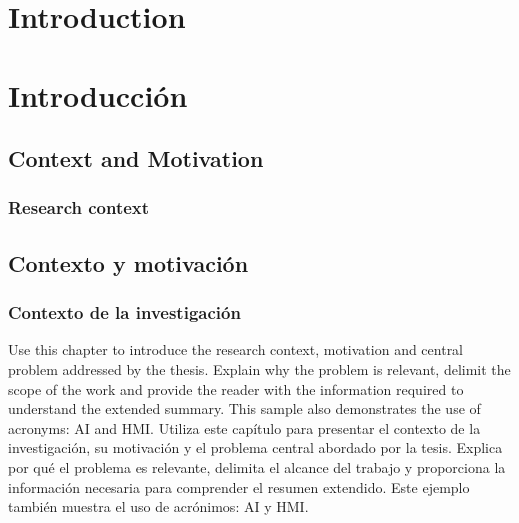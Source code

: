 %

{
  \chapter{Introduction}
}
{
  \chapter{Introducción}
}
\label{cha:compendium-introduction}

{
  \section{Context and Motivation}
  \subsection{Research context}
}
{
  \section{Contexto y motivación}
  \subsection{Contexto de la investigación}
}

{
  Use this chapter to introduce the research context, motivation and central problem addressed by the thesis. Explain why the problem is relevant, delimit the scope of the work and provide the reader with the information required to understand the extended summary. This sample also demonstrates the use of acronyms: \gls{AI} and \gls{HMI}.
}
{
  Utiliza este capítulo para presentar el contexto de la investigación, su motivación y el problema central abordado por la tesis. Explica por qué el problema es relevante, delimita el alcance del trabajo y proporciona la información necesaria para comprender el resumen extendido. Este ejemplo también muestra el uso de acrónimos: \gls{AI} y \gls{HMI}.
}

